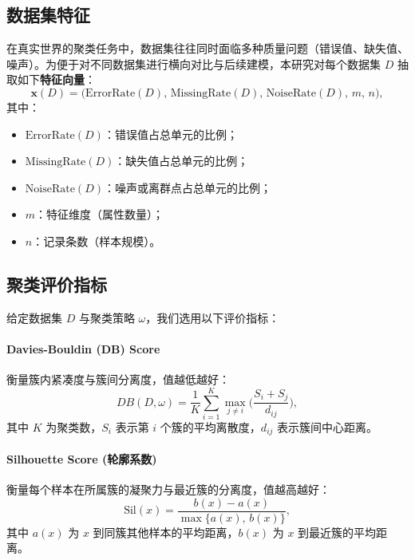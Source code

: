 \documentclass[8pt,twocolumn]{article} %
\numberwithin{equation}{section}
\begin{document}
\subsection{数据集特征}
\label{subsec:data-feature}
在真实世界的聚类任务中，数据集往往同时面临多种质量问题（错误值、缺失值、噪声）。为便于对不同数据集进行横向对比与后续建模，本研究对每个数据集 \(D\) 抽取如下\textbf{特征向量}：
\begin{equation}\label{eq:feature-vector}
\mathbf{x}(D) 
= \bigl(\mathrm{ErrorRate}(D),\,
\mathrm{MissingRate}(D),\,
\mathrm{NoiseRate}(D),\,
m,\,
n\bigr),
\end{equation}
其中：
\begin{itemize}
    \item \(\mathrm{ErrorRate}(D)\)：错误值占总单元的比例；
    \item \(\mathrm{MissingRate}(D)\)：缺失值占总单元的比例；
    \item \(\mathrm{NoiseRate}(D)\)：噪声或离群点占总单元的比例；
    \item \(m\)：特征维度（属性数量）；
    \item \(n\)：记录条数（样本规模）。
\end{itemize}

\subsection{聚类评价指标}
\label{subsec:clustering-metrics}

给定数据集 \(D\) 与聚类策略 \(\omega\)，我们选用以下评价指标：

\paragraph{Davies-Bouldin (DB) Score} 
衡量簇内紧凑度与簇间分离度，值越低越好：
\begin{equation}\label{eq:db-score}
DB(D,\omega)
= \frac{1}{K}\sum_{i=1}^{K}
\max_{j\neq i}
\biggl(\frac{S_i + S_j}{d_{ij}}\biggr),
\end{equation}
其中 \(K\) 为聚类数，\(S_i\) 表示第 \(i\) 个簇的平均离散度，\(d_{ij}\) 表示簇间中心距离。

\paragraph{Silhouette Score (轮廓系数)} 
衡量每个样本在所属簇的凝聚力与最近簇的分离度，值越高越好：
\begin{equation}\label{eq:silhouette}
\mathrm{Sil}(x)
= \frac{b(x) - a(x)}{\max\{a(x),\,b(x)\}},
\end{equation}
其中 \(a(x)\) 为 \(x\) 到同簇其他样本的平均距离，\(b(x)\) 为 \(x\) 到最近簇的平均距离。
\end{document}
